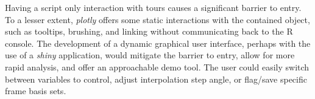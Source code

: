 \documentclass{monashthesis}
\begin{document}
Having a script only interaction with tours causes a significant barrier to entry. To a lesser extent, \emph{plotly} offers some static interactions with the contained object, such as tooltips, brushing, and linking without communicating back to the R console. The development of a dynamic graphical user interface, perhaps with the use of a \emph{shiny} \autocite{chang_shiny:_2018} application, would mitigate the barrier to entry, allow for more rapid analysis, and offer an approachable demo tool. The user could easily switch between variables to control, adjust interpolation step angle, or flag/save specific frame basis sets.

\printbibliography[heading=bibintoc]
\end{document}
